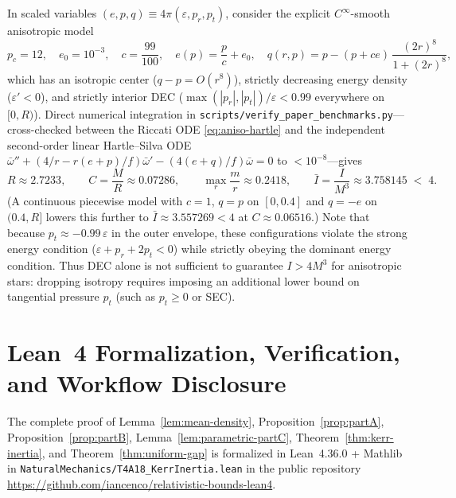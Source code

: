 \documentclass[11pt]{article}
\theoremstyle{plain}
\theoremstyle{definition}
\newcommand{\eps}{\varepsilon}
\newcommand{\Ibar}{\bar{I}}
\newcommand{\wbar}{\bar{\omega}}
\begin{document}
In scaled variables $(e, p, q) \equiv 4\pi(\eps, p_r, p_t)$, consider the explicit $C^\infty$-smooth anisotropic model
\begin{equation}
  p_c = 12, \quad e_0 = 10^{-3}, \quad c = \frac{99}{100}, \quad
  e(p) = \frac{p}{c} + e_0, \quad
  q(r, p) = p - (p + c e)\,\frac{(2r)^8}{1 + (2r)^8},
  \label{eq:aniso-smooth}
\end{equation}
which has an isotropic center ($q - p = O(r^8)$), strictly decreasing energy density ($\eps' < 0$), and strictly interior DEC ($\max(|p_r|, |p_t|)/\eps < 0.99$ everywhere on $[0, R)$). Direct numerical integration in \texttt{scripts/verify\_paper\_benchmarks.py}---cross-checked between the Riccati ODE \eqref{eq:aniso-hartle} and the independent second-order linear Hartle--Silva ODE $\wbar'' + (4/r - r(e+p)/f)\wbar' - (4(e+q)/f)\wbar = 0$ to $< 10^{-8}$---gives
\[
  R \approx 2.7233, \qquad C = \frac{M}{R} \approx 0.07286, \qquad \max_r\frac{m}{r} \approx 0.2418, \qquad
  \Ibar = \frac{I}{M^3} \approx 3.758145 \;<\; 4.
\]
(A continuous piecewise model with $c = 1$, $q = p$ on $[0, 0.4]$ and $q = -e$ on $(0.4, R]$ lowers this further to $\Ibar \approx 3.557269 < 4$ at $C \approx 0.06516$.) Note that because $p_t \approx -0.99\,\eps$ in the outer envelope, these configurations violate the strong energy condition ($\eps + p_r + 2 p_t < 0$) while strictly obeying the dominant energy condition. Thus DEC alone is not sufficient to guarantee $I > 4 M^3$ for anisotropic stars: dropping isotropy requires imposing an additional lower bound on tangential pressure $p_t$ (such as $p_t \ge 0$ or SEC).

\section{Lean~4 Formalization, Verification, and Workflow Disclosure}
\label{sec:lean}

The complete proof of Lemma~\ref{lem:mean-density}, Proposition~\ref{prop:partA}, Proposition~\ref{prop:partB}, Lemma~\ref{lem:parametric-partC}, Theorem~\ref{thm:kerr-inertia}, and Theorem~\ref{thm:uniform-gap} is formalized in Lean~4.36.0 + Mathlib in \texttt{NaturalMechanics/T4A18\_KerrInertia.lean} in the public repository \url{https://github.com/iancenco/relativistic-bounds-lean4}.
\end{document}
